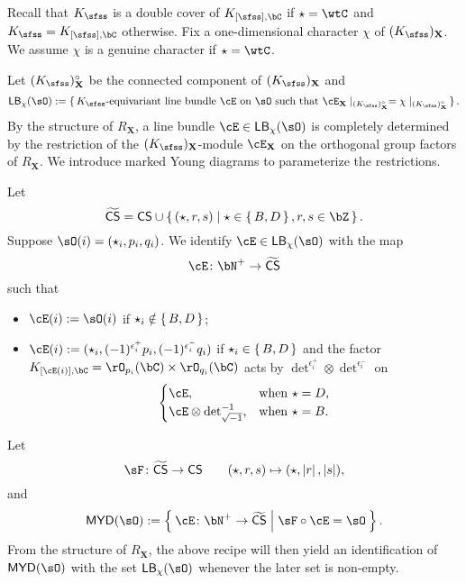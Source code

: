 \documentclass[12pt,a4paper]{amsart}
\def\MYD{{\mathsf{MYD}}}
\def\abs#1{\left|{#1}\right|}
\newcommand{\X}{\mathbf{X}}
\numberwithin{equation}{section}
\theoremstyle{remark}
\begin{document}
\medskip

\def\DCO#1{\mathsf{LB}_{#1}(\sO)}
\def\KsoX{{(\Ks)_{\X}^{\circ}}}
\def\KsX{(\Ks)_{\X}}

Recall that $\Ks$ is a double cover of $\KCs$ if $\star =  \wtC$ and $\Ks = \KCs$ otherwise.
Fix a one-dimensional character $\chi$ %
 of $\KsX$. We assume $\chi$ is a genuine character if $\star=\wtC$.

Let $\KsoX$ be the connected component of $\KsX$ and
\[
\DCO{\chi} := \set{\text{$\Ks$-equivariant line bundle $\cE$ on $\sO$
such that $\cE_{\X}\mid_{\KsoX}=\chi\mid_{\KsoX}$}}.
\]
By the structure of $R_{\X}$, a line bundle $\cE\in \DCO{\chi}$ is completely
determined by the restriction of the $\KsX$-module $\cE_{\X}$ on the orthogonal group factors of $R_{\X}$. We introduce marked Young diagrams to
parameterize the restrictions.

Let
\[
  \MK = \CCSS \cup \set{(\star,r,s)|\star\in \set{B,D}, r,s\in \bZ}.
\]
Suppose $\sO(i)=(\star_{i},p_{i}, q_{i})$. We identify $\cE \in \DCO{\chi}$ with the map
\[
  \cE\colon \bN^{+}\rightarrow  \MK
\]
such that
\begin{itemize}
  \item $\cE(i) := \sO(i)$ if $\star_{i} \notin \set{B,D}$;
  \item $\cE(i) := (\star_{i},(-1)^{\epsilon^{+}_{i}}p_{i},(-1)^{\epsilon^{-}_{i}}q_{i})$
        if $\star_{i}\in \set{B,D}$ and  the factor
        $\KC[[\cE(i)]] =\rO_{p_{i}}(\bC)\times \rO_{q_{i}}(\bC)$ acts by
        ${\det}^{\epsilon^{+}_{i}}\otimes {\det}^{\epsilon^{-}_{i}}$
        on
        \[
        \begin{cases}
          \cE, & \text{when } \star = D,\\
          \cE\otimes \deti^{-1} , & \text{when } \star = B.
        \end{cases}
        \]
\end{itemize}

Let
\begin{equation}\label{eq:F1}
\sF\colon \MK\rightarrow \CCSS\qquad (\star,r,s)\mapsto (\star,\abs{r},\abs{s}),
\end{equation}
and
\[
  \MYD(\sO) := \Set{\cE\colon \bN^{+}\rightarrow \MK|\sF\circ \cE=\sO }.
\]
From the structure of $R_{\X}$, the above recipe will then yield an identification of $\MYD(\sO)$ with the set $\DCO{\chi}$ whenever the later set is non-empty.
\end{document}
